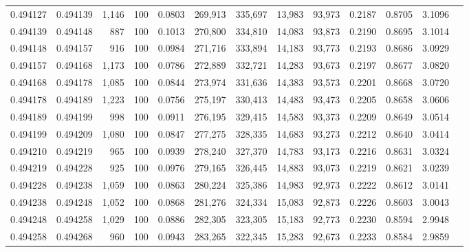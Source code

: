 \begin{tabular}{rrrrrrrrrrrrr}
0.494127 & 0.494139 & 1,146 & 100 &                                     0.0803 & 269,913 & 335,697 &  13,983 &  93,973 & 0.2187 & 0.8705 & 3.1096 \\
0.494139 & 0.494148 &   887 & 100 &                                     0.1013 & 270,800 & 334,810 &  14,083 &  93,873 & 0.2190 & 0.8695 & 3.1014 \\
0.494148 & 0.494157 &   916 & 100 &                                     0.0984 & 271,716 & 333,894 &  14,183 &  93,773 & 0.2193 & 0.8686 & 3.0929 \\
0.494157 & 0.494168 & 1,173 & 100 &                                     0.0786 & 272,889 & 332,721 &  14,283 &  93,673 & 0.2197 & 0.8677 & 3.0820 \\
0.494168 & 0.494178 & 1,085 & 100 &                                     0.0844 & 273,974 & 331,636 &  14,383 &  93,573 & 0.2201 & 0.8668 & 3.0720 \\
0.494178 & 0.494189 & 1,223 & 100 &                                     0.0756 & 275,197 & 330,413 &  14,483 &  93,473 & 0.2205 & 0.8658 & 3.0606 \\
0.494189 & 0.494199 &   998 & 100 &                                     0.0911 & 276,195 & 329,415 &  14,583 &  93,373 & 0.2209 & 0.8649 & 3.0514 \\
0.494199 & 0.494209 & 1,080 & 100 &                                     0.0847 & 277,275 & 328,335 &  14,683 &  93,273 & 0.2212 & 0.8640 & 3.0414 \\
0.494210 & 0.494219 &   965 & 100 &                                     0.0939 & 278,240 & 327,370 &  14,783 &  93,173 & 0.2216 & 0.8631 & 3.0324 \\
0.494219 & 0.494228 &   925 & 100 &                                     0.0976 & 279,165 & 326,445 &  14,883 &  93,073 & 0.2219 & 0.8621 & 3.0239 \\
0.494228 & 0.494238 & 1,059 & 100 &                                     0.0863 & 280,224 & 325,386 &  14,983 &  92,973 & 0.2222 & 0.8612 & 3.0141 \\
0.494238 & 0.494248 & 1,052 & 100 &                                     0.0868 & 281,276 & 324,334 &  15,083 &  92,873 & 0.2226 & 0.8603 & 3.0043 \\
0.494248 & 0.494258 & 1,029 & 100 &                                     0.0886 & 282,305 & 323,305 &  15,183 &  92,773 & 0.2230 & 0.8594 & 2.9948 \\
0.494258 & 0.494268 &   960 & 100 &                                     0.0943 & 283,265 & 322,345 &  15,283 &  92,673 & 0.2233 & 0.8584 & 2.9859 \\

\end{tabular}
